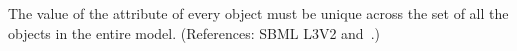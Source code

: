 The value of the attribute  of every \UnitDefinition object must
be unique across the set of all the \UnitDefinition objects in the entire
model.  (References: SBML L3V2 
and~.)

